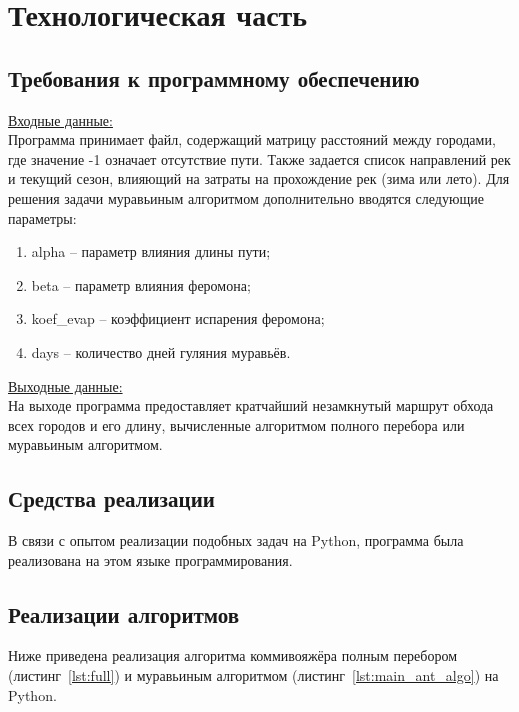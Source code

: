 \section{Технологическая часть}
\subsection{Требования к программному обеспечению}

\hspace{1.20cm}
\underline{Входные данные:}\\
Программа принимает файл, содержащий матрицу расстояний между городами, где значение -1 означает отсутствие пути. Также задается список направлений рек  и текущий сезон, влияющий на затраты на прохождение рек (зима или лето). Для решения задачи муравьиным алгоритмом дополнительно вводятся следующие параметры:

\begin{enumerate}[label=\arabic*)]
  \item alpha -- параметр влияния длины пути;
  \item beta -- параметр влияния феромона;
  \item koef\_evap -- коэффициент испарения феромона;
  \item days -- количество дней гуляния муравьёв.
\end{enumerate}

\underline{Выходные данные:}\\
На выходе программа предоставляет кратчайший незамкнутый маршрут обхода всех городов и его длину, вычисленные алгоритмом полного перебора или муравьиным алгоритмом.

\subsection{Средства реализации}

\hspace{1.25cm}
В связи с опытом реализации подобных задач на Python, программа была реализована на этом языке программирования.

\subsection{Реализации алгоритмов}

\hspace{1.25cm}
Ниже приведена реализация алгоритма коммивояжёра полным перебором (листинг~\ref{lst:full}) и муравьиным алгоритмом (листинг~\ref{lst:main_ant_algo}) на Python.

